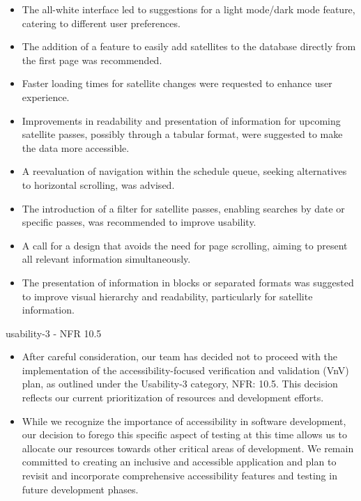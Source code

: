 \documentclass[12pt, titlepage]{article}
\begin{document}
\begin{itemize}
\begin{itemize}
\begin{itemize}
            \item The all-white interface led to suggestions for a light mode/dark mode feature, catering to different user preferences.
            \item The addition of a feature to easily add satellites to the database directly from the first page was recommended.
            \item Faster loading times for satellite changes were requested to enhance user experience.
            \item Improvements in readability and presentation of information for upcoming satellite passes, possibly through a tabular format, were suggested to make the data more accessible.
            \item A reevaluation of navigation within the schedule queue, seeking alternatives to horizontal scrolling, was advised.
            \item The introduction of a filter for satellite passes, enabling searches by date or specific passes, was recommended to improve usability.
            \item A call for a design that avoids the need for page scrolling, aiming to present all relevant information simultaneously.
            \item The presentation of information in blocks or separated formats was suggested to improve visual hierarchy and readability, particularly for satellite information.
        \end{itemize}
    \end{itemize}
\end{itemize}

usability-3 - NFR 10.5
\begin{itemize}
    \item After careful consideration, our team has decided not to proceed with the implementation of the accessibility-focused verification and validation (VnV) plan, as outlined under the Usability-3 category, NFR: 10.5. This decision reflects our current prioritization of resources and development efforts. 
    \item While we recognize the importance of accessibility in software development, our decision to forego this specific aspect of testing at this time allows us to allocate our resources towards other critical areas of development. We remain committed to creating an inclusive and accessible application and plan to revisit and incorporate comprehensive accessibility features and testing in future development phases. 
\end{itemize}
\end{document}

